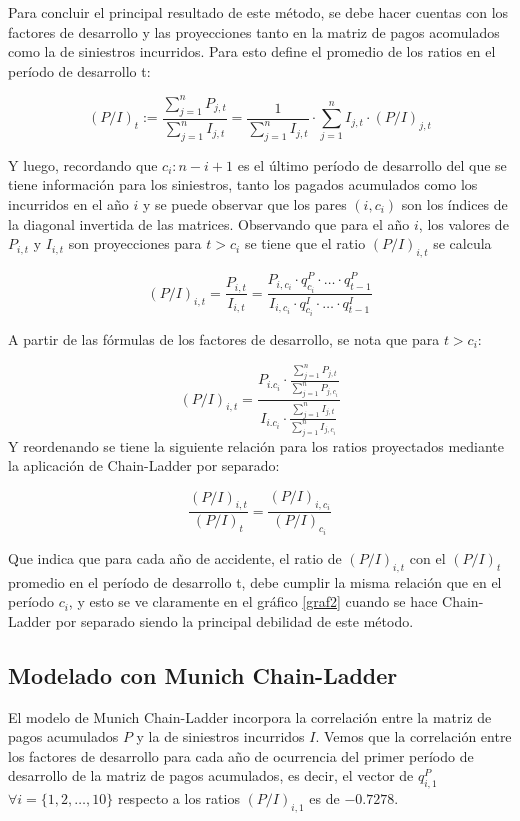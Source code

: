 \documentclass[
  12pt,
]{article}
\begin{document}
Para concluir el principal resultado de este método, se debe hacer
cuentas con los factores de desarrollo y las proyecciones tanto en la
matriz de pagos acomulados como la de siniestros incurridos. Para esto
define el promedio de los ratios en el período de desarrollo t:

\[
(P/I)_t := \frac{\sum_{j=1}^n P_{j,t}}{\sum_{j=1}^n I_{j,t}} = \frac{1}{\sum_{j=1}^n I_{j,t}}\cdot \sum_{j=1}^n I_{j,t}\cdot (P/I)_{j,t}
\]

Y luego, recordando que \(c_i:n-i+1\) es el último período de desarrollo
del que se tiene información para los siniestros, tanto los pagados
acumulados como los incurridos en el año \(i\) y se puede observar que
los pares \((i,c_i)\) son los índices de la diagonal invertida de las
matrices. Observando que para el año \(i\), los valores de \(P_{i,t}\) y
\(I_{i,t}\) son proyecciones para \(t>c_i\) se tiene que el ratio
\((P/I)_{i,t}\) se calcula

\[
(P/I)_{i,t} = \frac{P_{i,t}}{I_{i,t}} = \frac{P_{i,c_i}\cdot q_{c_i}^P \cdot \ldots \cdot q_{t-1}^P}{I_{i,c_i}\cdot q_{c_i}^I \cdot \ldots \cdot q_{t-1}^I}
\]

A partir de las fórmulas de los factores de desarrollo, se nota que para
\(t>c_i\):

\[
(P/I)_{i,t} = \frac{P_{i.c_i}\cdot \frac{\sum_{j=1}^n P_{j,t}}{\sum_{j=1}^n P_{j,c_i}}}{I_{i.c_i}\cdot \frac{\sum_{j=1}^n I_{j,t}}{\sum_{j=1}^n I_{j,c_i}}}
\] Y reordenando se tiene la siguiente relación para los ratios
proyectados mediante la aplicación de Chain-Ladder por separado:

\[
\frac{(P/I)_{i,t}}{(P/I)_t} = \frac{(P/I)_{i,c_i}}{(P/I)_{c_i}}
\]

Que indica que para cada año de accidente, el ratio de \((P/I)_{i,t}\)
con el \((P/I)_t\) promedio en el período de desarrollo t, debe cumplir
la misma relación que en el período \(c_i\), y esto se ve claramente en
el gráfico \ref{graf2} cuando se hace Chain-Ladder por separado siendo
la principal debilidad de este método.

\subsection{Modelado con Munich
Chain-Ladder}\label{modelado-con-munich-chain-ladder}

El modelo de Munich Chain-Ladder incorpora la correlación entre la
matriz de pagos acumulados \(P\) y la de siniestros incurridos \(I\).
Vemos que la correlación entre los factores de desarrollo para cada año
de ocurrencia del primer período de desarrollo de la matriz de pagos
acumulados, es decir, el vector de \(q_{i,1}^P\)
\(\forall i = \{1,2,\ldots,10\}\) respecto a los ratios \((P/I)_{i,1}\)
es de \(-0.7278\).
\end{document}
